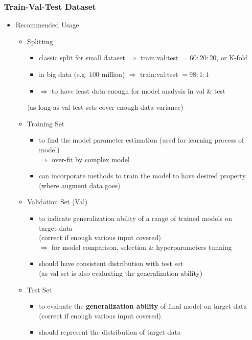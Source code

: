 \subsubsection{Train-Val-Test Dataset}
\begin{itemize}
\item Recommended Usage
	\begin{itemize}
	\item Splitting 
		\begin{itemize}
		\item classic split for small dataset $\Rightarrow$ train:val:test $= 60:20:20$, or K-fold
		\item in big data (e.g. $100$ million) $\Rightarrow$ train:val:test $= 98:1:1$
		\item $\Rightarrow$ to have least data enough for model analysis in val \& test
		\end{itemize}
		(as long as val-test sets cover enough data variance)
	\item Training Set
		\begin{itemize}
		\item to find the model parameter estimation (used for learning process of model) \\
		$\Rightarrow$ over-fit by complex model
		\item can incorporate methods to train the model to have desired property \\
		(where augment data goes)
		\end{itemize}
	\item Validation Set (Val)
		\begin{itemize}
		\item to indicate generalization ability of a range of trained models on target data \\
		(correct if enough various input covered) \\
		$\Rightarrow$ for model comparison, selection \& hyperparameters tunning
		\item should have consistent distribution with test set \\
		(as val set is also evaluating the generalization ability)
		\end{itemize}
	\item Test Set
		\begin{itemize}
		\item to evaluate the \textbf{generalization ability} of final model on target data \\
		(correct if enough various input covered)
		\item should represent the distribution of target data \\

\end{itemize}
\end{itemize}
\end{itemize}
